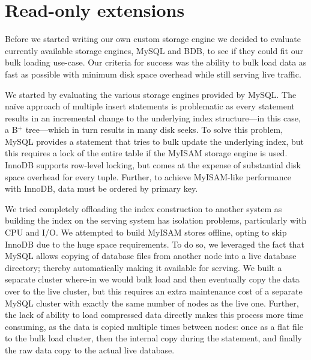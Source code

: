 
\section{Read-only extensions}
\label{sec:read_only}

Before we started writing our own custom storage engine we decided to
evaluate currently available storage engines, MySQL and BDB, to see 
if they could fit our bulk loading use-case. Our criteria for success 
was the ability to bulk load data as fast as possible with minimum 
disk space overhead while still serving live traffic.
 
We started by evaluating the various storage engines provided by
MySQL. The na\"ive approach of multiple insert statements is
problematic as every statement results in an incremental change to the
underlying index structure---in this case, a B$^{+}$ tree---which in
turn results in many disk seeks. To solve this problem, MySQL provides
a  statement that tries to bulk update the underlying
index, but this requires a lock of the entire table if the MyISAM
storage engine is used. InnoDB supports row-level locking, but comes
at the expense of substantial disk space overhead for every tuple.
Further, to achieve MyISAM-like performance with InnoDB, data must be
ordered by primary key.

We tried completely offloading the index construction to another
system as building the index on the serving system has isolation
problems, particularly with CPU and I/O. We attempted to build MyISAM
stores offline, opting to skip InnoDB due to the huge space
requirements. To do so, we leveraged the fact that MySQL allows
copying of database files from another node into a live database
directory; thereby automatically making it available for serving. We built a
separate cluster where-in we would bulk load and then eventually copy
the data over to the live cluster, but this requires an extra
maintenance cost of a separate MySQL cluster with exactly the same
number of nodes as the live one. Further, the lack of ability to load
compressed data directly makes this process more time consuming, as
the data is copied multiple times between nodes: once as a flat file
to the bulk load cluster, then the internal copy during the 
statement, and finally the raw data copy to the actual live database. 

